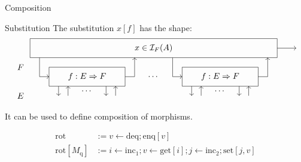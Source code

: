 \documentclass[aspectratio=54]{beamer}
\newcommand{\kw}[1]{\ensuremath{ \mathrm{#1} }}
\begin{document}
\begin{frame}{Composition} %
  \begin{block}{Substitution}
    The substitution $x[f]$ has the shape:
    \[
    \begin{tikzpicture}[scale=0.4]
      \draw[->] (13, 3) -- (15, 3);
      \draw (-13, 2) rectangle (13, 4);
      \node at (0, 3) {$x \in \mathcal{I}_F(A)$};
      \begin{scope}[xshift=-7cm]
        \draw (-4,-1) rectangle (4,1);
        \draw[->] (-5, 2) |- (-4,0);
        \draw[->] (4,0) -| (5,2);
        \node (f) at (0,0) {$f : E \Rightarrow F$};
        \draw[->] (-3, -1) -- (-3, -2);
        \draw[->] (-2, -2) -- (-2, -1);
        \node[below] at (0, -1) {$\cdots$};
        \draw[->] (2, -1) -- (2, -2);
        \draw[->] (3, -2) -- (3, -1);
      \end{scope}
      \node at (0, 0) {$\cdots$};
      \begin{scope}[xshift=7cm]
        \draw (-4,-1) rectangle (4,1);
        \draw[->] (-5, 2) |- (-4,0);
        \draw[->] (4,0) -| (5,2);
        \node (f) at (0,0) {$f : E \Rightarrow F$};
        \draw[->] (-3, -1) -- (-3, -2);
        \draw[->] (-2, -2) -- (-2, -1);
        \node[below] at (0, -1) {$\cdots$};
        \draw[->] (2, -1) -- (2, -2);
        \draw[->] (3, -2) -- (3, -1);
      \end{scope}
      \node at (-14,  1) {$F$};
      \node at (-14, -2) {$E$};
    \end{tikzpicture}
    \]
    It can be used to define composition of morphisms.
  \end{block}
  \pause
  \begin{example}
    \vspace{-3ex}
    \begin{align*}
      \kw{rot} &:=
        v \mathop{\leftarrow} \kw{deq} \mathop{;} \kw{enq}[v] \\
      \kw{rot}[M_\kw{q}] &:=
        i \mathop{\leftarrow} \kw{inc}_1 \mathop{;}
        v \mathop{\leftarrow} \kw{get}[i] \mathop{;}
        j \mathop{\leftarrow} \kw{inc}_2 \mathop{;}
        \kw{set}[j, v]
    \end{align*}
  \end{example}
\end{frame}
\end{document}
